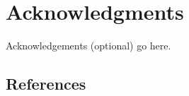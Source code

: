 \documentclass{sig-alternate-05-2015}
\begin{document}
\section{Acknowledgments}

Acknowledgements (optional) go here.

%

%
%


\subsection{References}
\end{document}
